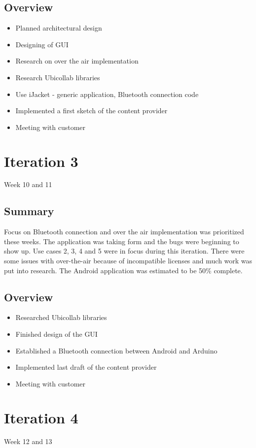 \subsection{Overview}
\begin{itemize}
	\item{Planned architectural design}
	\item{Designing of GUI}
	\item{Research on over the air implementation}
	\item{Research Ubicollab libraries}
	\item{Use iJacket - generic application, Bluetooth connection code}
	\item{Implemented a first sketch of the content provider}
	\item{Meeting with customer}
\end{itemize}

\section{Iteration 3}
Week 10 and 11
\subsection{Summary}
	Focus on Bluetooth connection and over the air implementation was prioritized these weeks. The application was taking form and the bugs were beginning to show up. Use cases 2, 3, 4 and 5 were in focus during this iteration. There were some issues with over-the-air because of incompatible licenses and much work was put into research. The Android application was estimated to be 50\% complete.

\subsection{Overview}
\begin{itemize}
	\item{Researched Ubicollab libraries}
	\item{Finished design of the GUI}
	\item{Established a Bluetooth connection between Android and Arduino}
	\item{Implemented last draft of the content provider}
	\item{Meeting with customer}
\end{itemize}

\section{Iteration 4}\label{sec:Iteration4}
Week 12 and 13
